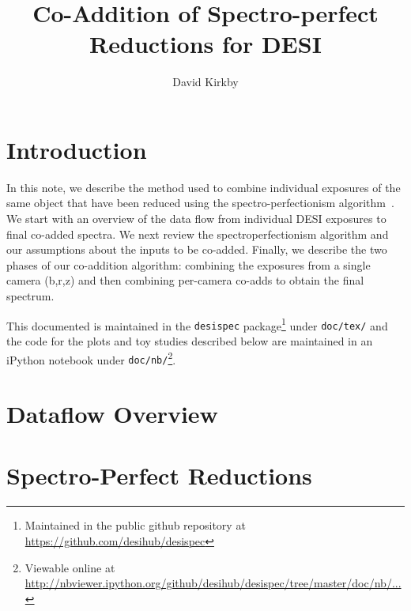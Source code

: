 \documentclass[12pt]{article}
\title{Co-Addition of Spectro-perfect\\
Reductions for DESI}
\author{David Kirkby}
\begin{document}
\maketitle

\section{Introduction}

In this note, we describe the method used to combine individual exposures of the same object that have been reduced using the spectro-perfectionism algorithm~\cite{2010PASP..122..248B}. We start with an overview of the data flow from individual DESI exposures to final co-added spectra. We next review the spectroperfectionism algorithm and our assumptions about the inputs to be co-added. Finally, we describe the two phases of our co-addition algorithm: combining the exposures from a single camera (b,r,z) and then combining per-camera co-adds to obtain the final spectrum.

This documented is maintained in the {\tt desispec} package\footnote{Maintained in the public github repository at \url{https://github.com/desihub/desispec}} under {\tt doc/tex/} and the code for the plots and toy studies described below are maintained in an iPython notebook under {\tt doc/nb/}\footnote{Viewable online at \url{http://nbviewer.ipython.org/github/desihub/desispec/tree/master/doc/nb/...}}.

\section{Dataflow Overview}

\section{Spectro-Perfect Reductions}
\end{document}
